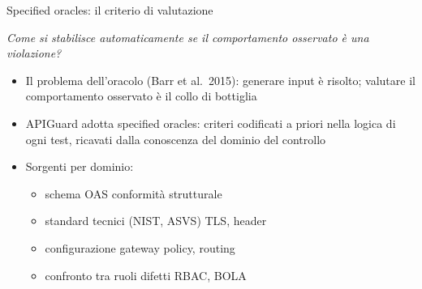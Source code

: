 
\begin{frame}{Specified oracles: il criterio di valutazione}
  \begin{center}
    \small\textit{Come si stabilisce automaticamente se il comportamento osservato è una violazione?}
  \end{center}
  \vspace{0.4em}
  \begin{itemize}
    \item Il problema dell'oracolo (Barr et al.\ 2015): generare input è risolto; \alert{valutare il comportamento osservato} è il collo di bottiglia

    \item APIGuard adotta \alert{specified oracles}: criteri codificati \alert{a priori} nella logica di ogni test, ricavati dalla conoscenza del dominio del controllo

    \item Sorgenti per dominio:
          \begin{itemize}
            \item schema OAS \textrightarrow{} conformità strutturale
            \item standard tecnici (NIST, ASVS) \textrightarrow{} TLS, header
            \item configurazione gateway \textrightarrow{} policy, routing
            \item confronto tra ruoli \textrightarrow{} difetti RBAC, BOLA
          \end{itemize}
  \end{itemize}
\end{frame}